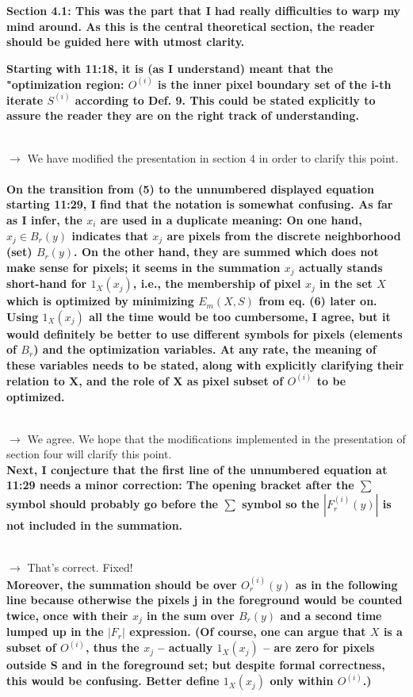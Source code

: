 \documentclass[12pt]{article}
\begin{document}
\textbf{Section 4.1: This was the part that I had really difficulties to warp my mind
around. As this is the central theoretical section, the reader should be
guided here with utmost clarity.}


\textbf{Starting with 11:18, it is (as I understand) meant that the "optimization
region: $O^{(i)}$ is the inner pixel boundary set of the i-th iterate $S^{(i)}$
according to Def. 9. This could be stated explicitly to assure the reader they
are on the right track of understanding.}

~\\
$\rightarrow$ We have modified the presentation in section 4 in order to clarify this point.
~\\

\textbf{On the transition from (5) to the unnumbered displayed equation starting 11:29, I find that the notation is somewhat confusing. As far as I infer, the $x_i$ are used in a duplicate meaning: On one hand, $x_j\in B_r(y)$ indicates that $x_j$ are pixels from the discrete neighborhood (set) $B_r(y)$. On the other hand, they are summed which does not make sense for pixels; it seems in the summation $x_j$ actually stands short-hand for $1_X(x_j)$, i.e., the membership of pixel $x_j$ in the set $X$ which is optimized by minimizing $E_m(X,S)$ from eq. (6) later on. Using $1_X(x_j)$ all the time would be too cumbersome, I agree, but it would definitely be better to use different symbols for pixels (elements of $B_r$) and the optimization variables. At any rate, the meaning of these variables needs to be stated, along with explicitly clarifying their relation to X, and the role of X as pixel subset of $O^{(i)}$ to be optimized.}

~\\
$\rightarrow$ We agree. We hope that the modifications implemented in the presentation of section four will clarify this point.
~\\


\textbf{Next, I conjecture that the first line of the unnumbered equation at 11:29
needs a minor correction: The opening bracket after the $\sum$ symbol should
probably go before the $\sum$ symbol so the $|F_r^{(i)}(y)|$ is not included in the summation. }

~\\
$\rightarrow$ That's correct. Fixed!
~\\

\textbf{Moreover, the summation should be over $O_r^{(i)}(y)$ as in the following line because otherwise the pixels j in the foreground would be counted twice, once with their $x_j$ in the sum over $B_r(y)$ and a second time lumped up in the $|F_r|$ expression. (Of course, one can argue that $X$ is a subset of $O^{(i)}$, thus the $x_j$ -- actually $1_X(x_j)$ -- are zero for pixels outside S and in the foreground set; but despite formal correctness, this would be confusing. Better define $1_X(x_j)$ only within $O^{(i)}$.) }
\end{document}
